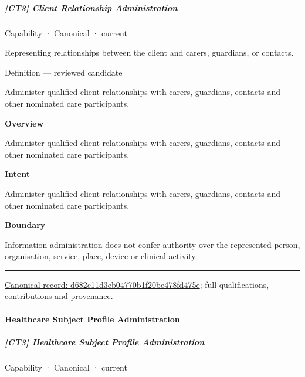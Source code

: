 \subparagraph{[CT3] Client Relationship Administration}

\label{element:d682c11d3eb04770b1f20be478fd475e}
{\small Capability · Canonical · current}\par

Representing relationships between the client and carers, guardians, or contacts.



Definition — reviewed candidate



Administer qualified client relationships with carers, guardians, contacts and other nominated care participants.



\textbf{Overview}



Administer qualified client relationships with carers, guardians, contacts and other nominated care participants.



\textbf{Intent}



Administer qualified client relationships with carers, guardians, contacts and other nominated care participants.



\textbf{Boundary}



Information administration does not confer authority over the represented person, organisation, service, place, device or clinical activity.



\medskip\hrule\medskip

{\footnotesize \href{../../../../continuum/strategy/capability/d682c11d3eb04770b1f20be478fd475e.md}{Canonical record: d682c11d3eb04770b1f20be478fd475e}; full qualifications, contributions and provenance.}\par
\paragraph{Healthcare Subject Profile Administration}

\subparagraph{[CT3] Healthcare Subject Profile Administration}

\label{element:df214b5499694b768eb4a7a175a9d471}
{\small Capability · Canonical · current}\par

